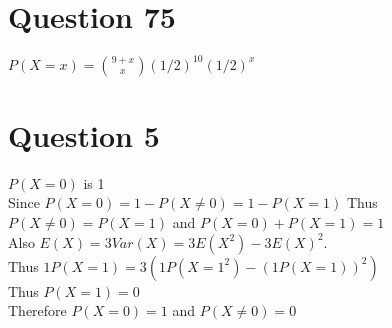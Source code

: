 \documentclass{article}
\begin{document}
\section*{Question 75}
$P(X = x) = \binom{9+x}{x} (1/2)^10(1/2)^x$

\section*{Question 5}
$P(X = 0)$ is 1\\
Since $P(X=0) = 1 - P(X \neq 0) = 1 - P(X = 1)$ Thus $P(X\neq 0) = P(X = 1)$ and $P(X=0) + P(X=1) = 1$\\
Also $E(X) = 3Var(X) = 3E(X^2) - 3E(X)^2$.\\
Thus $1P(X=1) = 3(1P(X=1^2) - (1P(X=1))^2)$\\
Thus $P(X=1) = 0$\\
Therefore $P(X=0) = 1$ and $P(X \neq 0) = 0$\\
\end{document}
